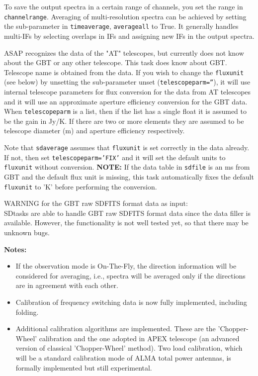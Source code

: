   To save the output spectra in a certain range of 
  channels, you set the range in {\tt channelrange}.
  Averaging of multi-resolution
  spectra can be achieved by setting the sub-parameter in {\tt timeaverage}, {\tt averageall} 
  to True. It generally handles multi-IFs by selecting overlaps in IFs and assigning
  new IFs in the output spectra.

  ASAP recognizes the data of the "AT" telescopes, but currently
  does not know about the GBT or any other telescope. This task
  does know about GBT. Telescope name is obtained from the data.
  If you wish to change the {\tt fluxunit} (see below) by unsetting
  the sub-parameter unset ({\tt telescopeparm=''}),
  it will use internal telescope parameters for
  flux conversion for the data from AT telescopes and it will use an
  approximate aperture efficiency conversion for the GBT data.
  When {\tt telescopeparm} is a list, then if the list has a single float it
  is assumed to be the gain in Jy/K.  If there are two or more elements they are assumed
  to be telescope diameter (m) and aperture efficiency
  respectively.

  Note that {\tt sdaverage} assumes that {\tt fluxunit} is set correctly in
  the data already.  If not, then set {\tt telescopeparm='FIX'} and it
  will set the default units to {\tt fluxunit} without conversion.
  {\bf NOTE:} If the data table in {\tt sdfile} is an ms from GBT and the default flux
  unit is missing, this task automatically fixes the default {\tt fluxunit}
  to 'K' before performing the conversion.

  WARNING for the GBT raw SDFITS format data as input:\\
  SDtasks are able to handle GBT raw SDFITS format data since the 
  data filler is available. However, the functionality is not well 
  tested yet, so that there may be unknown bugs. 

\medskip
{\bf Notes:}
 \begin{itemize}
  \item If the observation mode is On-The-Fly, the direction
information will be considered for averaging, i.e., spectra will be
averaged only if the directions are in agreement with each other.
  \item Calibration of frequency switching data is now fully implemented, including folding.
  \item Additional calibration algorithms are implemented. These are the
'Chopper-Wheel' calibration and the one adopted in APEX telescope (an advanced version of classical 'Chopper-Wheel' method). Two load
calibration, which will be a standard calibration mode of ALMA total
power antennas, is formally implemented but still experimental.
\end{itemize}

